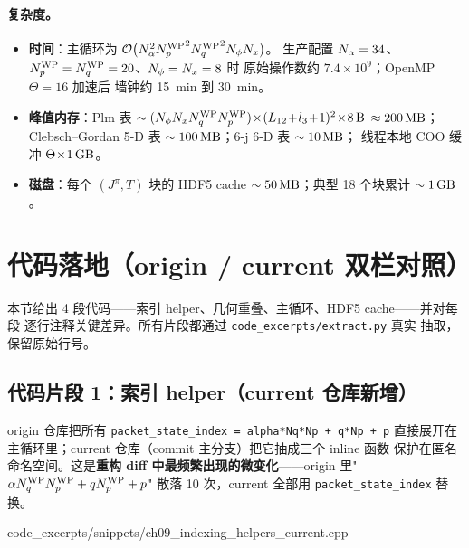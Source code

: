 \paragraph{复杂度。}
\begin{itemize}
\item \textbf{时间}：主循环为
      \(\mathcal{O}\bigl(N_\alpha^2{N_{p}^{\text{WP}}}^2{N_{q}^{\text{WP}}}^2N_{\phi}N_{x}\bigr)\)。
      生产配置 \(N_\alpha=34\)、\({N_{p}^{\text{WP}}}={N_{q}^{\text{WP}}}=20\)、\(N_{\phi}=N_{x}=8\) 时
      原始操作数约 \(7.4\times 10^{9}\)；OpenMP \(\Theta=16\) 加速后
      墙钟约 \SI{15}{\minute} 到 \SI{30}{\minute}。
\item \textbf{峰值内存}：Plm 表
      \(\sim (\Nphi\NxGL\NqWP\NpWP)\!\times\!(L_{12}\!+\!l_3\!+\!1)^2\!\times\!8\,\textrm{B}\)
      \(\approx \SI{200}{\mega\byte}\)；Clebsch--Gordan 5-D 表 \(\sim
      \SI{100}{\mega\byte}\)；6-j 6-D 表 \(\sim \SI{10}{\mega\byte}\)；
      线程本地 COO 缓冲 \(\Theta\!\times\!\SI{1}{\giga\byte}\)。
\item \textbf{磁盘}：每个 \((J^\pi,T)\) 块的 HDF5 cache
      \(\sim \SI{50}{\mega\byte}\)；典型 18 个块累计 \(\sim
      \SI{1}{\giga\byte}\)。
\end{itemize}

\section{代码落地（origin / current 双栏对照）}
\label{sec:ch09-codeland}

本节给出 4 段代码——索引 helper、几何重叠、主循环、HDF5 cache——并对每段
逐行注释关键差异。所有片段都通过 \texttt{code\_excerpts/extract.py} 真实
抽取，保留原始行号。

\subsection{代码片段 1：索引 helper（current 仓库新增）}
\label{subsec:ch09-code-indexing}

origin 仓库把所有 \texttt{packet\_state\_index = alpha*Nq*Np + q*Np + p}
直接展开在主循环里；current 仓库（commit 主分支）把它抽成三个 inline 函数
保护在匿名命名空间。这是\textbf{重构 diff 中最频繁出现的微变化}——origin
里"\(\alpha{N_{q}^{\text{WP}}}{N_{p}^{\text{WP}}}+q{N_{p}^{\text{WP}}}+p\)" 散落 10 次，current 全部用
\texttt{packet\_state\_index} 替换。


{code_excerpts/snippets/ch09_indexing_helpers_current.cpp}

